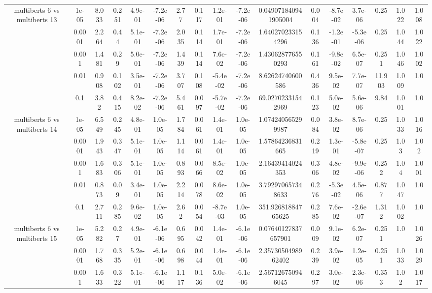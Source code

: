 \begin{tabular}{|c|c|c|c|c|c|c|c|c|c|c|c|c|c|c|c|c|}
\hline
\multirow{5}{*}{multiberts 6 vs multiberts 13} & 1e-05 & 8.033 & 0.251 & 4.9e-01 & -7.2e-06 & 2.77 & 0.117 & 1.2e-01 & -7.2e-06 & 0.049071840941905004 & 0.004 & -8.7e-02 & 3.7e-06 & 0.25 & 1.022 & 1.008 \\
 & 0.0001 & 2.264 & 0.44 & 5.1e-01 & -7.2e-06 & 2.035 & 0.114 & 1.7e-01 & -7.2e-06 & 1.640270233154296 & 0.136 & -1.2e-01 & -5.3e-06 & 0.25 & 1.044 & 1.022 \\
 & 0.001 & 1.481 & 0.29 & 5.0e-01 & -7.2e-06 & 1.439 & 0.114 & 7.6e-02 & -7.2e-06 & 1.430628776550293 & 0.161 & -9.8e-02 & 6.5e-07 & 0.251 & 1.046 & 1.002 \\
 & 0.01 & 0.908 & 0.102 & 3.5e-01 & -7.2e-06 & 3.707 & 0.108 & -5.4e-02 & -7.2e-06 & 8.62624740600586 & 0.436 & 9.5e-02 & 7.7e-07 & 11.903 & 1.009 & 1.0 \\
 & 0.1 & 3.82 & 0.415 & 8.2e-02 & -7.2e-06 & 5.461 & 0.097 & -5.7e-02 & -7.2e-06 & 69.02702331542969 & 0.123 & 5.0e-02 & 5.6e-06 & 9.84 & 1.001 & 1.0 \\
\hline
\multirow{5}{*}{multiberts 6 vs multiberts 14} & 1e-05 & 6.549 & 0.245 & 4.8e-01 & 1.0e-05 & 1.784 & 0.061 & 1.4e-01 & 1.0e-05 & 1.074240565299987 & 0.084 & 3.8e-02 & 8.7e-06 & 0.25 & 1.033 & 1.016 \\
 & 0.0001 & 1.943 & 0.347 & 5.1e-01 & 1.0e-05 & 1.114 & 0.061 & 1.4e-01 & 1.0e-05 & 1.57864236831665 & 0.219 & 1.3e-01 & -5.8e-07 & 0.25 & 1.03 & 1.02 \\
 & 0.001 & 1.683 & 0.306 & 5.1e-01 & 1.0e-05 & 0.893 & 0.066 & 8.5e-02 & 1.0e-05 & 2.16439414024353 & 0.306 & 4.8e-02 & -9.9e-06 & 0.252 & 1.04 & 1.001 \\
 & 0.01 & 0.873 & 0.09 & 3.4e-01 & 1.0e-05 & 2.214 & 0.078 & 8.6e-02 & 1.0e-05 & 3.792970657348633 & 0.276 & -5.3e-02 & 4.5e-06 & 0.877 & 1.047 & 1.0 \\
 & 0.1 & 2.711 & 0.285 & 9.6e-02 & 1.0e-05 & 2.62 & 0.054 & -8.7e-03 & 1.0e-05 & 351.92681884765625 & 0.285 & 7.6e-02 & -2.6e-07 & 1.312 & 1.002 & 1.0 \\
\hline
\multirow{5}{*}{multiberts 6 vs multiberts 15} & 1e-05 & 5.282 & 0.27 & 4.9e-01 & -6.1e-06 & 0.695 & 0.042 & 1.4e-01 & -6.1e-06 & 0.07640127837657901 & 0.009 & 9.1e-02 & 6.2e-07 & 0.251 & 1.0 & 1.026 \\
 & 0.0001 & 1.768 & 0.335 & 5.2e-01 & -6.1e-06 & 0.698 & 0.044 & 1.4e-01 & -6.1e-06 & 2.3573050498962402 & 0.239 & 3.9e-02 & 1.2e-05 & 0.251 & 1.033 & 1.029 \\
 & 0.001 & 1.633 & 0.322 & 5.1e-01 & -6.1e-06 & 1.117 & 0.136 & 5.0e-02 & -6.1e-06 & 2.567126750946045 & 0.297 & 3.0e-02 & 2.3e-06 & 0.353 & 1.02 & 1.017 \\

\end{tabular}
